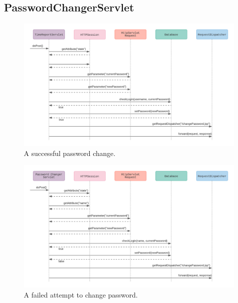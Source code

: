 \documentclass{article}
\begin{document}
\pagebreak
\subsection{PasswordChangerServlet}

\begin{figure}[h]
    \centering
    \includegraphics[scale=0.5]{images/successfulPasswordChange.png}
    \caption{A successful password change.}
    \label{fig:sucessfulPasswordChange}
\end{figure}

\begin{figure}[H]
    \centering
    \includegraphics[scale=0.5]{images/unsuccessfulPasswordChange.png}
    \caption{A failed attempt to change password.}
    \label{fig:failedPasswordChange}
\end{figure}
\end{document}
